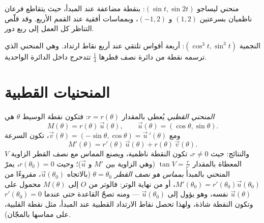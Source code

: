 \begin{omfigure}

{\small منحني ليساجو $(\sin t, \sin 2t)$: بنقطة مضاعفة
عند المبدأ، حيث يتقاطع فرعان ناظميان بسرعتين
$(1, 2)$ و $(-1, 2)$، وبمماسات أفقية عند القمم
الأربع. وقد قلّص التناظر كل العمل إلى ربع دور.}
\end{omfigure}

\begin{omfigure}

{\small النجمية $(\cos^3 t, \sin^3 t)$: أربعة أقواس تلتقي عند
أربع نقاط ارتداد. وهي المنحني الذي ترسمه نقطة من دائرة نصف قطرها
$\frac14$ تتدحرج داخل الدائرة الواحدية.}
\end{omfigure}

\section{المنحنيات القطبية}

\begin{definition}\label{def:b1:curves:polar}
\emph{المنحني القطبي} يُعطى بالمقدار $r = r(\theta)$:
فتكون نقطة الوسيط $\theta$ هي
\[
M(\theta) = r(\theta)\,\vec u(\theta),
\qquad \vec u(\theta) = (\cos\theta, \sin\theta).
\]
ومع $\vec v(\theta) = (-\sin\theta, \cos\theta) = \vec
u\,'(\theta)$، تكون السرعة
\[
M'(\theta) = r'(\theta)\, \vec u(\theta) + r(\theta)\, \vec
v(\theta) .
\]
والنتائج: حيث $r \neq 0$، تكون النقطة ناظمية، ويصنع
المماس مع نصف القطر الزاوية $V$ المعطاة بالمقدار $\tan V =
\frac{r}{r'}$ (وهي الزاوية بين $M'$ و $\vec u$)؛ وحيث $r(\theta_0)
= 0$، يمرّ المنحني بالمبدأ \emph{بمماس هو نصف القطر
$\theta = \theta_0$} (بالاتجاه $\vec u(\theta_0)$، مقروءًا من
$M'(\theta_0) = r'(\theta_0)\vec u(\theta_0)$، أو من نهاية
الوتر: فالوتر من $O$ إلى $M(\theta)$ محمول على $\vec
u(\theta)$ نفسه، وهو يؤول إلى $\vec u(\theta_0)$ --- ومنه
تصحّ القاعدة حتى عندما $r'(\theta_0) = 0$ وتكون النقطة
شاذة، ولهذا تحصل نقاط الارتداد القطبية عند المبدأ، مثل نقطة
القلبية، على مماسها بالمجّان).
\end{definition}

